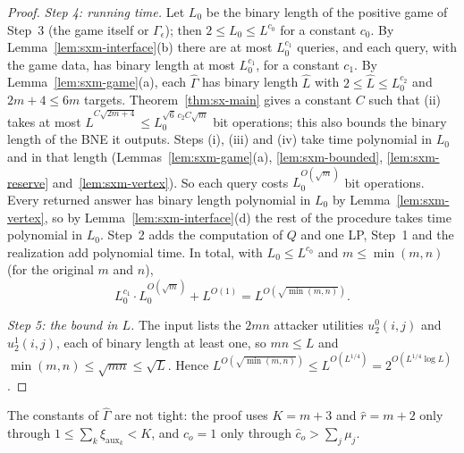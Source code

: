 \begin{proof}
\emph{Step 4: running time.} Let $L_0$ be the binary length of the positive game of Step~3 (the game
itself or $\Gamma_\epsilon$); then $2\le L_0\le L^{c_0}$ for a constant $c_0$. By
Lemma~\ref{lem:sxm-interface}(b) there are at most $L_0^{c_1}$ queries, and each query, with the game
data, has binary length at most $L_0^{c_1}$, for a constant $c_1$. By Lemma~\ref{lem:sxm-game}(a), each
$\widehat\Gamma$ has binary length $\hat L$ with $2\le\hat L\le L_0^{c_2}$ and $2m+4\le6m$ targets.
Theorem~\ref{thm:sx-main} gives a constant $C$ such that (ii) takes at most
$\hat L^{C\sqrt{2m+4}}\le L_0^{\sqrt6\,c_2C\sqrt m}$ bit operations; this also bounds the binary length of
the BNE it outputs. Steps (i), (iii) and (iv) take time polynomial in $L_0$ and in that length
(Lemmas~\ref{lem:sxm-game}(a), \ref{lem:sxm-bounded}, \ref{lem:sxm-reserve} and~\ref{lem:sxm-vertex}).
So each query costs $L_0^{O(\sqrt m)}$ bit operations. Every returned answer has binary length polynomial
in $L_0$ by Lemma~\ref{lem:sxm-vertex}, so by Lemma~\ref{lem:sxm-interface}(d) the rest of the
procedure takes time polynomial in $L_0$. Step~2 adds the computation of $Q$ and one LP, Step~1 and the
realization add polynomial time. In total, with $L_0\le L^{c_0}$ and $m\le\min(m,n)$ (for the original
$m$ and $n$),
\[
L_0^{c_1}\cdot L_0^{O(\sqrt m)}+L^{O(1)}=L^{O(\sqrt{\min(m,n)})} .
\]

\emph{Step 5: the bound in $L$.} The input lists the $2mn$ attacker utilities $u_2^0(i,j)$ and
$u_2^1(i,j)$, each of binary length at least one, so $mn\le L$ and
$\min(m,n)\le\sqrt{mn}\le\sqrt L$. Hence
$L^{O(\sqrt{\min(m,n)})}\le L^{O(L^{1/4})}=2^{O(L^{1/4}\log L)}$.
\end{proof}

The constants of $\widehat\Gamma$ are not tight: the proof uses $K=m+3$ and $\hat r=m+2$ only through
$1\le\sum_k\xi_{\mathrm{aux}_k}<K$, and $\hat c_o=1$ only through $\hat c_o>\sum_j\mu_j$.

